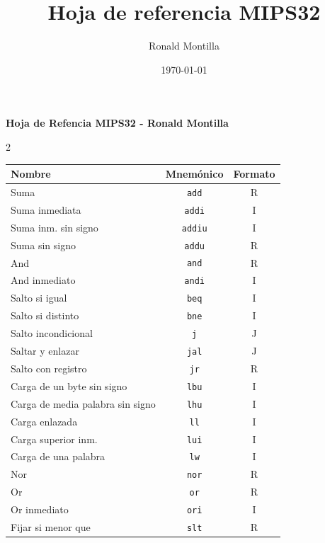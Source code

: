 \documentclass[11pt, a4paper]{article}
\title{
    \textbf{Hoja de referencia MIPS32}
}
\author{Ronald Montilla}
\date{\today}
\begin{document}
{\centering \textbf{Hoja de Refencia MIPS32 - Ronald Montilla} \\}
    \begin{multicols*}{2}

        \begin{tcolorbox}[
        colback=white, 
        colframe=blue!40!black, 
        title= {\centering \textbf{Repertorio de Instrucciones MIPS32} },
        fonttitle=\bfseries,
        size=small
        ]
            \begin{tabularx}{\linewidth}{Xcc}
                \toprule
                \textbf{Nombre} & \textbf{Mnemónico} & \textbf{Formato} \\
                \midrule
                Suma & \texttt{add} & R \\
                Suma inmediata & \texttt{addi} & I \\
                Suma inm. sin signo & \texttt{addiu} & I \\
                Suma sin signo & \texttt{addu} & R \\
                And & \texttt{and} & R \\
                And inmediato & \texttt{andi} & I \\
                Salto si igual & \texttt{beq} & I \\
                Salto si distinto & \texttt{bne} & I \\
                Salto incondicional & \texttt{j} & J \\
                Saltar y enlazar & \texttt{jal} & J \\
                Salto con registro & \texttt{jr} & R \\
                Carga de un byte sin signo & \texttt{lbu} & I \\
                Carga de media palabra sin signo & \texttt{lhu} & I \\
                Carga enlazada & \texttt{ll} & I \\
                Carga superior inm. & \texttt{lui} & I \\
                Carga de una palabra & \texttt{lw} & I \\
                Nor & \texttt{nor} & R \\
                Or & \texttt{or} & R \\
                Or inmediato & \texttt{ori} & I \\
                Fijar si menor que & \texttt{slt} & R \\

\end{tabularx}
\end{tcolorbox}
\end{multicols*}
\end{document}
